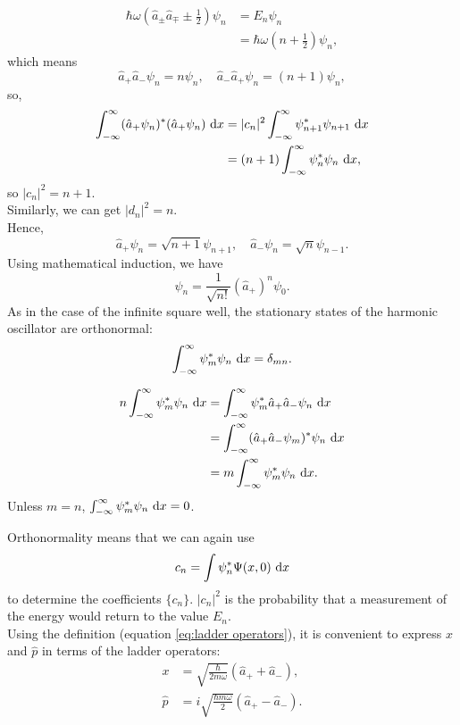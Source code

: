 \documentclass[en, oneside]{vivi}
\begin{document}
\begin{align}
    \hbar \omega \left( \hat a_\pm \hat a_\mp \pm \frac{1}{2} \right) \psi_n &= E_n \psi_n\\
    &= \hbar \omega \left( n + \frac{1}{2} \right) \psi_n,
\end{align}
which means
\begin{equation}
    \hat a_+ \hat a_- \psi_n = n \psi_n, \quad \hat a_- \hat a_+ \psi_n= (n + 1)\psi_n,
\end{equation}
so,
\begin{align}
    \int_{-\infty} ^\infty (\hat a_+ \psi_n) ^* (\hat a_+ \psi_n) \dif x &= |c_n|^2 \int_{-\infty} ^\infty \psi_{n + 1} ^* \psi_{n + 1} \dif x\\
    &= (n+1) \int_{-\infty} ^\infty \psi_n ^* \psi_n \dif x,
\end{align}
so $|c_n|^2 = n + 1$.\\
Similarly, we can get $|d_n|^2 = n$.\\
Hence,
\begin{equation}
    \hat a_+ \psi_n = \sqrt{n + 1} \psi_{n + 1}, \quad \hat a_- \psi_n = \sqrt{n} \psi_{n - 1}.
\end{equation}
Using mathematical induction, we have
\begin{equation}
    \psi_n = \frac{1}{\sqrt{n!}} (\hat a_+)^n \psi_0.
\end{equation}
As in the case of the infinite square well, the stationary states of the harmonic oscillator are orthonormal:
\begin{equation}
    \int_{-\infty} ^\infty \psi_m ^* \psi_n \dif x = \delta_{mn}.
\end{equation}
\begin{pf}
    \begin{align*}
        n \int_{-\infty} ^\infty \psi_m ^* \psi_n \dif x &= \int_{-\infty} ^\infty \psi_m ^* \hat a_+ \hat a_- \psi_n \dif x\\
        &= \int_{-\infty} ^\infty (\hat a_+ \hat a_- \psi_m) ^* \psi_n \dif x\\
        &= m \int_{-\infty} ^\infty \psi_m ^* \psi_n \dif x.
    \end{align*}
    Unless $m = n$, $\int_{-\infty} ^\infty \psi_m ^* \psi_n \dif x = 0$.
\end{pf}
Orthonormality means that we can again use 
\begin{equation}
    c_n = \int \psi_n ^* \Psi(x, 0) \dif x
\end{equation}
to determine the coefficients $\{ c_n \}$. $|c_n|^2$ is the probability that a measurement of the energy would return to the value $E_n$.\\
Using the definition (equation \ref{eq:ladder operators}), it is convenient to express $x$ and $\hat p$ in terms of the ladder operators:
\begin{align}
    x &= \sqrt{\frac{\hbar}{2m \omega}} (\hat a_+ + \hat a_-),\\
    \hat p &= i \sqrt{\frac{\hbar m \omega}{2}} (\hat a_+ - \hat a_-).
\end{align}
\end{document}
